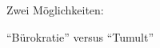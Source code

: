 \documentclass[t]{beamer}
\begin{document}

\begin{frame}[label=ct8]{\color{fg}{Verteilung der Sticks}}
 \vspace{10mm}
Zwei Möglichkeiten:\\[10mm]
\begin{center}
"`Bürokratie"'  \qquad versus \qquad "`Tumult"'
\end{center}
\end{frame}






%
%
\end{document}
